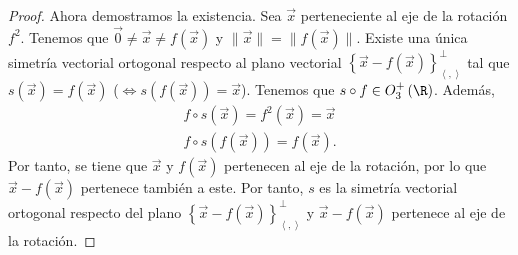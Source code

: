 \begin{proof}
Ahora demostramos la existencia. Sea $\displaystyle \vec{x}  $ perteneciente al eje de la rotación $\displaystyle f^{2} $. Tenemos que $\displaystyle \vec{0} \neq \vec{x} \neq f\left(\vec{x}\right) $ y $\displaystyle \|\vec{x}\| = \|f\left(\vec{x}\right)\| $. Existe una única simetría vectorial ortogonal respecto al plano vectorial $\displaystyle \left\{ \vec{x}-f\left(\vec{x}\right)\right\} ^{\perp }_{\left\langle ,  \right\rangle } $ tal que $\displaystyle s\left(\vec{x}\right) = f\left(\vec{x}\right) $ ($\displaystyle \iff s\left(f\left(\vec{x}\right)\right) = \vec{x} $).
Tenemos que $\displaystyle s\circ f \in O^{+}_{3}\left(\R\right) $. Además,
\[
\begin{split}
f\circ s\left(\vec{x}\right) = f^{2}\left(\vec{x}\right) = \vec{x} \\
f\circ s\left(f\left(\vec{x}\right)\right) = f\left(\vec{x}\right).
\end{split}
\]
Por tanto, se tiene que $\displaystyle \vec{x} $ y $\displaystyle f\left(\vec{x}\right) $ pertenecen al eje de la rotación, por lo que $\displaystyle \vec{x} -f\left(\vec{x}\right) $ pertenece también a este. Por tanto, $\displaystyle s $ es la simetría vectorial ortogonal respecto del plano $\displaystyle \left\{ \vec{x}-f\left(\vec{x}\right)\right\} ^{\perp }_{\left\langle ,  \right\rangle } $ y $\displaystyle \vec{x}-f\left(\vec{x}\right)  $ pertenece al eje de la rotación.
\end{proof}
